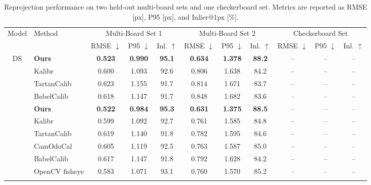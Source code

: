 \begin{table}[t]
\centering
\caption{Reprojection performance on two held-out multi-board sets and one checkerboard set. Metrics are reported as RMSE [px], P95 [px], and Inlier@1px [\%].}
\label{tab:reprojection_comparison}
\scriptsize
\renewcommand{\arraystretch}{1.06}
\setlength{\tabcolsep}{2.6pt}
\begin{tabular*}{\textwidth}{@{\extracolsep{\fill}}clccccccccc@{}}
\toprule
\multirow{2}{*}{Model} & \multirow{2}{*}{Method}
& \multicolumn{3}{c}{Multi-Board Set 1}
& \multicolumn{3}{c}{Multi-Board Set 2}
& \multicolumn{3}{c}{Checkerboard Set} \\
\cmidrule(lr){3-5}\cmidrule(lr){6-8}\cmidrule(lr){9-11}
& & RMSE $\downarrow$ & P95 $\downarrow$ & Inl. $\uparrow$
  & RMSE $\downarrow$ & P95 $\downarrow$ & Inl. $\uparrow$
  & RMSE $\downarrow$ & P95 $\downarrow$ & Inl. $\uparrow$ \\
\midrule
\multirow{4}{*}{DS}
& \textbf{Ours}       & \textbf{0.523} & \textbf{0.990} & \textbf{95.1} & \textbf{0.634} & \textbf{1.378} & \textbf{88.2} & -- & -- & -- \\
& Kalibr              & 0.600 & 1.093 & 92.6 & 0.806 & 1.638 & 84.2 & -- & -- & -- \\
& TartanCalib         & 0.623 & 1.155 & 91.7 & 0.814 & 1.671 & 83.7 & -- & -- & -- \\
& BabelCalib          & 0.618 & 1.147 & 91.7 & 0.848 & 1.682 & 83.6 & -- & -- & -- \\
\addlinespace[2pt]

\multirow{6}{*}{KB}
& \textbf{Ours}       & \textbf{0.522} & \textbf{0.984} & \textbf{95.3} & \textbf{0.631} & \textbf{1.375} & \textbf{88.5} & -- & -- & -- \\
& Kalibr              & 0.599 & 1.092 & 92.7 & 0.761 & 1.585 & 84.8 & -- & -- & -- \\
& TartanCalib         & 0.619 & 1.140 & 91.8 & 0.782 & 1.595 & 84.6 & -- & -- & -- \\
& CamOdoCal           & 0.605 & 1.119 & 92.5 & 0.763 & 1.587 & 85.0 & -- & -- & -- \\
& BabelCalib          & 0.617 & 1.147 & 91.8 & 0.792 & 1.628 & 84.2 & -- & -- & -- \\
& OpenCV fisheye      & 0.583 & 1.071 & 93.1 & 0.760 & 1.570 & 85.2 & -- & -- & -- \\
\addlinespace[2pt]


\end{tabular*}
\end{table}
